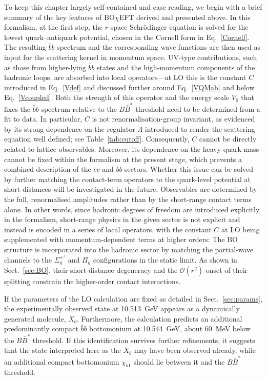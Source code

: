 \documentclass[aps,prd,showpacs,amsmath,twocolumn,superscriptaddress,floatfix,nofootinbib,notitlepage]{revtex4-2}
\newcommand{\Xb}{X_b}
\newcommand{\BOchiEFT}{BO$\chi$EFT\xspace}
\begin{document}
To keep this chapter largely self-contained and ease reading,
we begin with a brief summary of the key features of \BOchiEFT
derived and presented above. In this formalism, 
at the first step, the $r$-space Schr{\"o}dinger equation is solved
for the lowest quark--antiquark potential, chosen in the Cornell form in Eq.~\eqref{Cornell}. The resulting $\bar{b}b$ spectrum and the corresponding wave functions are then used 
as input for the scattering kernel in momentum space.
UV-type contributions, such as those from higher-lying $\bar{b}b$ states and the high-momentum components of the hadronic loops, are absorbed into local operators---at LO this is the constant $C$ introduced in Eq.~\eqref{Vdef} and 
discussed further around Eq.~\eqref{VQMab} and below Eq.~\eqref{Vcoupled}. Both the strength of this operator and the energy scale $V_0$ that fixes the $\bar{b}b$ spectrum relative to the $B\bar{B}^*$ threshold need to be determined from a fit to data.
In particular, $C$ is not renormalisation-group invariant, as evidenced by its strong dependence on the regulator $\Lambda$ introduced to render the scattering equation well defined; see Table~\ref{tab:cutoff}. Consequently, $C$ cannot be directly related to lattice observables. Moreover, its dependence on the heavy-quark mass cannot be fixed within
the formalism at the present stage, which prevents a combined description of the $\bar{c}c$ and $\bar{b}b$ sectors. 
Whether this issue can be solved by further matching the contact-term operators to the quark-level potential at short distances will be investigated in the future.
Observables are determined by the full, renormalised amplitudes rather than by the short-range contact terms alone. In other words, since hadronic degrees of freedom are introduced explicitly in the formalism, short-range physics in the given sector is not explicit and instead is encoded in a series of local operators, with the constant $C$ at LO being supplemented with momentum-dependent terms at higher orders:
The BO structure is incorporated into the hadronic
sector by matching the partial-wave channels to the $\Sigma_g^{+\prime}$ and $\Pi_g$ configurations in the static limit. As shown in Sect.~\ref{sec:BO}, their short-distance degeneracy and the $\mathcal{O}(r^2)$ onset of their splitting constrain the higher-order contact interactions.

If the parameters of the LO calculation are fixed as detailed in 
Sect.~\ref{sec:params}, the experimentally observed state at 10.513~GeV appears as a dynamically generated molecule, $\Xb$. Furthermore, the calculation predicts an additional predominantly compact $\bar{b}b$ bottomonium at 10.544~GeV, about 60~MeV below the $B\bar{B}^*$ threshold. If this identification survives further refinements, it suggests that the state interpreted here as the $\Xb$ may have been observed already, while an additional compact bottomonium $\chi_{b1}$ should lie between it and the $B\bar{B}^*$ threshold.
\end{document}
